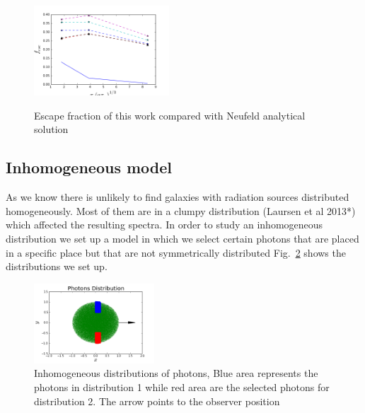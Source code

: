 \documentclass[usenatbib]{mn2e}
\begin{document}

\begin{figure}
  \includegraphics[width=0.45\textwidth]{Neufeld.png}
 \label{figure:efvsNeufeld}\caption{Escape fraction of this work compared with Neufeld analytical solution} 
\end{figure}

\subsection{Inhomogeneous model}

As we know there is unlikely to find galaxies with radiation sources 
distributed homogeneously. Most of them are in a clumpy distribution 
(Laursen et al 2013*) which affected the resulting spectra. In order 
to study an inhomogeneous distribution we set up a model in which we 
select certain photons that are placed in a specific place but that 
are not symmetrically distributed Fig.~\ref{figure:distributions} shows
the distributions we set up. 

\begin{figure}
  \includegraphics[width=0.40\textwidth]{Distribution.png}
  \caption{Inhomogeneous distributions of 
 photons, Blue area represents the photons in distribution 1 while red area are the selected photons for distribution 2. The arrow points to the observer position\label{figure:distributions}} 
\end{figure}
\end{document}
